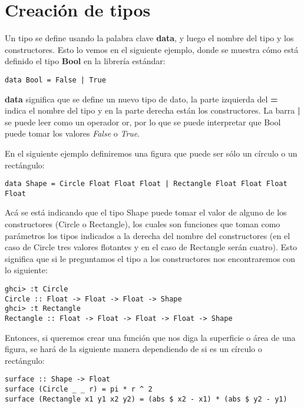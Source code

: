 \section{Creación de tipos} %
\label{sec:creaci_n_de_tipos}

Un tipo se define usando la palabra clave \textbf{data}, y luego el nombre del tipo y los constructores. Esto lo vemos en el siguiente ejemplo, donde se muestra cómo está definido el tipo \textbf{Bool} en la librería estándar:

\begin{lstlisting}
data Bool = False | True
\end{lstlisting}

\textbf{data} significa que se define un nuevo tipo de dato, la parte izquierda del \textbf{=} indica el nombre del tipo y en la parte derecha están los constructores. La barra \textbf{|} se puede leer como un operador or, por lo que se puede interpretar que Bool puede tomar los valores \textit{False} o \textit{True}.

En el siguiente ejemplo definiremos una figura que puede ser sólo un círculo o un rectángulo:

\begin{lstlisting}
data Shape = Circle Float Float Float | Rectangle Float Float Float Float
\end{lstlisting}

Acá se está indicando que el tipo Shape puede tomar el valor de alguno de los constructores (Circle o Rectangle), los cuales son funciones que toman como parámetros los tipos indicados a la derecha del nombre del constructores (en el caso de Circle tres valores flotantes y en el caso de Rectangle serán cuatro). Esto significa que si le preguntamos el tipo a los constructores nos encontraremos con lo siguiente:

\begin{lstlisting}
ghci> :t Circle
Circle :: Float -> Float -> Float -> Shape
ghci> :t Rectangle
Rectangle :: Float -> Float -> Float -> Float -> Shape
\end{lstlisting}

Entonces, si queremos crear una función que nos diga la superficie o área de una figura, se hará de la siguiente manera dependiendo de si es un círculo o rectángulo:

\begin{lstlisting}
surface :: Shape -> Float
surface (Circle _ _ r) = pi * r ^ 2
surface (Rectangle x1 y1 x2 y2) = (abs $ x2 - x1) * (abs $ y2 - y1)
\end{lstlisting}

